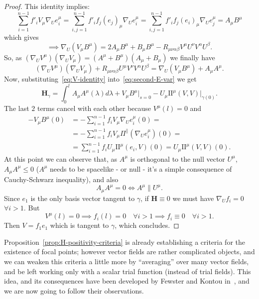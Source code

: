\begin{proof}
	This identity implies:
	\[
	\sum_{i = 1}^{n - 1}f'_iV_{\mu}\nabla_Ue_i^{\mu} = \sum_{i, j = 1}^{n - 1}f'_if_j(e_j)_{\mu}\nabla_Ue_i^{\mu} = \sum_{i, j = 1}^{n - 1}f'_if_j(e_i)_{\mu}\nabla_Ue_j^{\mu} = A_{\mu}B^{\mu}
	\]
	which gives
	\[
	\implies \nabla_U(V_{\mu}B^{\mu}) = 2A_{\mu}B^{\mu} + B_{\mu}B^{\mu} - R_{\mu\nu\alpha\beta}V^{\mu}U^{\nu}V^{\alpha}U^{\beta}.
	\]
	So, as \((\nabla_UV^{\mu})(\nabla_UV_{\mu}) = (A^{\mu} + B^{\mu}) (A_{\mu} + B_{\mu})\) we finally have
	\begin{equation}
	\label{eq:V-identity}
		(\nabla_UV^{\mu})(\nabla_UV_{\mu}) + R_{\mu\nu\alpha\beta}U^{\mu}V^{\nu}V^{\alpha}U^{\beta} =  \nabla_U(V_{\mu}B^{\mu})  + A_{\mu}A^{\mu}.
	\end{equation}
	Now, substituting~\eqref{eq:V-identity} into~\eqref{eq:second-E-var} we get
	\[
	\textbf{H}_{\gamma} = \int_{0}^{l} A_{\mu}A^{\mu}(\lambda) d\lambda + V_{\mu}B^{\mu}\Big\vert_{s = 0} - U_{\mu}\mathrm{I\!I}^{\mu}(V, V)\vert_{\gamma(0)}.
	\]
	The last \(2\) terms cancel with each other because \(V^{\mu}(l) = 0\) and 
	\begin{align*}
		-V_{\mu}B^{\mu}(0) &= - \sum_{i = 1}^{n - 1}f_i V_{\mu}\nabla_Ue_i^{\mu}(0) =\\
		& = - \sum_{i = 1}^{n - 1}f_i V_{\mu}\Pi^{\parallel}\left(\nabla_Ue_i^{\mu}\right)(0) =\\
		& = \sum_{i = 1}^{n - 1}f_i U_{\mu}\mathrm{I\!I}^{\mu}(e_i, V)(0) = U_{\mu}\mathrm{I\!I}^{\mu}(V, V)(0).
	\end{align*}
	At this point we can observe that, as \(A^{\mu}\) is orthogonal to the null vector \(U^{\mu}\), \(A_{\mu}A^{\mu} \le 0\) (\(A^{\mu}\) needs to be spacelike - or null - it's a simple consequence of Cauchy-Schwarz inequality), and also
	\[
	A_{\mu}A^{\mu} = 0 \iff A^{\mu}\parallel U^{\mu}.
	\]
	Since \(e_1\) is the only basis vector tangent to \(\gamma\), if \(\textbf{H} \equiv 0\) we must have \(\nabla_Uf_i = 0\) \(\forall i > 1\). But
	\[
	V^{\mu}(l) = 0 \implies f_i(l) = 0 \quad \forall i > 1 \implies f_i\equiv 0 \quad \forall i > 1.
	\]
	Then \(V = f_1e_1\) which is tangent to \(\gamma\), which concludes.
\end{proof}

Proposition~\ref{prop:H-positivity-criteria} is already establishing a criteria for the existence of focal points; however vector fields are rather complicated objects, and we can weaken this criteria a little more by ``averaging'' over many vector fields, and be left working only with a scalar trial function (instead of trial fields). This idea, and its consequences have been developed by Fewster and Kontou in~\cite{fewster2020new}, and we are now going to follow their observations.

